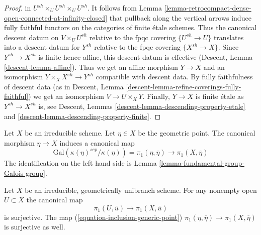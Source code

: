 \begin{proof}
in $U^{sh} \times_U U^{sh} \times_U U^{sh}$. It follows from
Lemma \ref{lemma-retrocompact-dense-open-connected-at-infinity-closed}
that pullback along the vertical arrows induce fully faithful functors on
the categories of finite \'etale schemes. Thus the
canonical descent datum on $V \times_U U^{sh}$ relative to
the fpqc covering $\{U^{sh} \to U\}$ translates into a
descent datum for $Y^{sh}$ relative to the fpqc covering $\{X^{sh} \to X\}$.
Since $Y^{sh} \to X^{sh}$ is finite hence affine, this descent datum is
effective (Descent, Lemma \ref{descent-lemma-affine}).
Thus we get an affine morphism $Y \to X$ and an isomorphism
$Y \times_X X^{sh} \to Y^{sh}$ compatible with descent data.
By fully faithfulness of descent data
(as in Descent, Lemma \ref{descent-lemma-refine-coverings-fully-faithful})
we get an isomorphism $V \to U \times_X Y$.
Finally, $Y \to X$ is finite \'etale as $Y^{sh} \to X^{sh}$ is, see
Descent, Lemmas \ref{descent-lemma-descending-property-etale} and
\ref{descent-lemma-descending-property-finite}.
\end{proof}

\noindent
Let $X$ be an irreducible scheme. Let $\eta \in X$ be the geometric
point. The canonical morphism $\eta \to X$ induces a canonical map
\begin{equation}
\label{equation-inclusion-generic-point}
\text{Gal}(\kappa(\eta)^{sep}/\kappa(\eta)) = \pi_1(\eta, \overline{\eta})
\longrightarrow \pi_1(X, \overline{\eta})
\end{equation}
The identification on the left hand side is
Lemma \ref{lemma-fundamental-group-Galois-group}.

\begin{lemma}
\label{lemma-irreducible-geometrically-unibranch}
Let $X$ be an irreducible, geometrically unibranch scheme.
For any nonempty open $U \subset X$ the canonical map
$$
\pi_1(U, \overline{u}) \longrightarrow \pi_1(X, \overline{u})
$$
is surjective. The map (\ref{equation-inclusion-generic-point})
$\pi_1(\eta, \overline{\eta}) \to \pi_1(X, \overline{\eta})$
is surjective as well.
\end{lemma}

